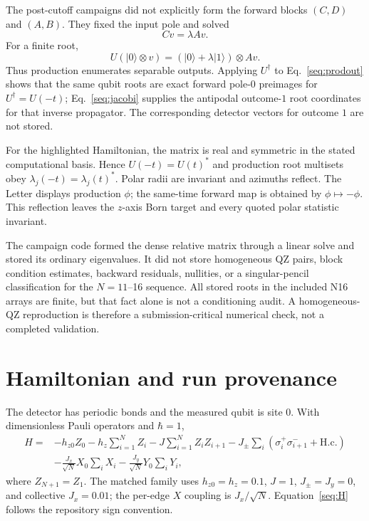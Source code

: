\documentclass[aps,prl,onecolumn,10pt,notitlepage,superscriptaddress,nofootinbib]{revtex4-2}
\begin{document}
The post-cutoff campaigns did not explicitly form the forward blocks $(C,D)$ and $(A,B)$.  They fixed the input pole and solved
\begin{equation}
Cv=\lambda Av.                                                                 \label{seq:prod}
\end{equation}
For a finite root,
\begin{equation}
U(|0\rangle\otimes v)=(|0\rangle+\lambda|1\rangle)\otimes Av.                 \label{seq:prodout}
\end{equation}
Thus production enumerates separable outputs.  Applying $U^\dagger$ to Eq.~\eqref{seq:prodout} shows that the same qubit roots are exact forward pole-$0$ preimages for $U^\dagger=U(-t)$; Eq.~\eqref{seq:jacobi} supplies the antipodal outcome-$1$ root coordinates for that inverse propagator.  The corresponding detector vectors for outcome $1$ are not stored.

For the highlighted Hamiltonian, the matrix is real and symmetric in the stated computational basis.  Hence $U(-t)=U(t)^*$ and production root multisets obey $\lambda_j(-t)=\lambda_j(t)^*$.  Polar radii are invariant and azimuths reflect.  The Letter displays production $\phi$; the same-time forward map is obtained by $\phi\mapsto-\phi$.  This reflection leaves the $z$-axis Born target and every quoted polar statistic invariant.

The campaign code formed the dense relative matrix through a linear solve and stored its ordinary eigenvalues.  It did not store homogeneous QZ pairs, block condition estimates, backward residuals, nullities, or a singular-pencil classification for the $N=11$--16 sequence.  All stored roots in the included N16 arrays are finite, but that fact alone is not a conditioning audit.  A homogeneous-QZ reproduction is therefore a submission-critical numerical check, not a completed validation.

\section{Hamiltonian and run provenance}

The detector has periodic bonds and the measured qubit is site $0$.  With dimensionless Pauli operators and $\hbar=1$,
\begin{align}
H={}&-h_{z0}Z_0-h_z\sum_{i=1}^{N}Z_i-J\sum_{i=1}^{N}Z_iZ_{i+1}
-J_\pm\sum_i(\sigma_i^+\sigma_{i+1}^-+\mathrm{H.c.})\nonumber\\
&-\frac{J_x}{\sqrt N}X_0\sum_iX_i-\frac{J_y}{\sqrt N}Y_0\sum_iY_i,            \label{seq:H}
\end{align}
where $Z_{N+1}=Z_1$.  The matched family uses $h_{z0}=h_z=0.1$, $J=1$, $J_\pm=J_y=0$, and collective $J_x=0.01$; the per-edge $X$ coupling is $J_x/\sqrt N$.  Equation~\eqref{seq:H} follows the repository sign convention.
\end{document}
